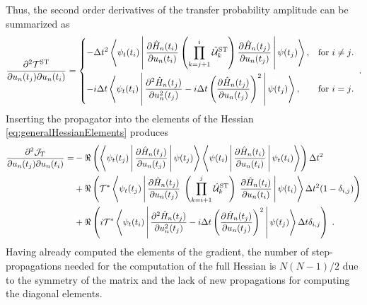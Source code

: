 Thus, the second order derivatives of the transfer probability amplitude can be summarized as 
\begin{equation}
	\frac{\partial^2 \mathcal{T}^{\mathrm{ST}}}{\partial u_n (t_j) \partial u_n (t_i)} =  
	\begin{dcases}
   - \Delta t^2 \Braket{\psi_t (t_i) | \frac{\partial \hat{H}_n (t_i)}{\partial u_n (t_i)} \left( \prod_{k = j + 1}^{i} \hat{\mathcal{U}}_{k}^{\mathrm{ST}} \right) \frac{\partial \hat{H}_n (t_j)}{\partial u_n (t_j)} | \psi (t_j) } , & \text{for $i \neq j$}.\\
    - i \Delta t \Braket{\psi_t (t_i) | \frac{\partial^2 \hat{H}_n (t_j)}{\partial u_n ^2 (t_j)} - i \Delta t \left( \frac{\partial \hat{H}_n (t_j)}{\partial u_n (t_j)} \right)^2 | \psi (t_j) }	, & \text{for $i = j$}.
  	\end{dcases} \; .
\end{equation} 
Inserting the propagator into the elements of the Hessian \eqref{eq:generalHessianElements} produces 
\begin{align}
	\frac{\partial^2 \mathcal{J}_T}{\partial u_n (t_j) \partial u_n (t_i)} =& - \Re \left( \Braket{\psi_t (t_j) | \frac{\partial \hat{H}_n  (t_j)}{\partial u_n (t_j)} | \psi (t_{j})} \Braket{\psi (t_{i}) | \frac{\partial \hat{H}_n  (t_i)}{\partial u_n (t_i)} | \psi_t (t_{i})} \right) \Delta t ^2 \nonumber \\
	&+ \Re \left( \mathcal{T}^* \Braket{\psi_t (t_j) | \frac{\partial \hat{H}_n  (t_j)}{\partial u_n (t_j)}  \; \left( \prod_{k = i+1}^{j} \hat{\mathcal{U}}_{k}^{\mathrm{ST}}  \right) \; \frac{\partial \hat{H}_n (t_i)}{\partial u_n (t_i)}  | \psi (t_{i})} \Delta t^ 2  ( 1 - \delta_{i , j}) \right) \nonumber \\
	&+ \Re \left( i \mathcal{T}^* \Braket{\psi_t (t_i) | \frac{\partial^2 \hat{H}_n (t_j)}{\partial u_n ^2 (t_j)} - i \Delta t \left( \frac{\partial \hat{H}_n (t_j)}{\partial u_n (t_j)} \right)^2 | \psi (t_j) } \Delta t \delta_{i,j} \right) \; .
	\label{eq:expandedHessianElements}
\end{align}
Having already computed the elements of the gradient, the number of step-propagations needed for the computation of the full Hessian is $N(N - 1)/2$ due to the symmetry of the matrix and the lack of new propagations for computing the diagonal elements.


